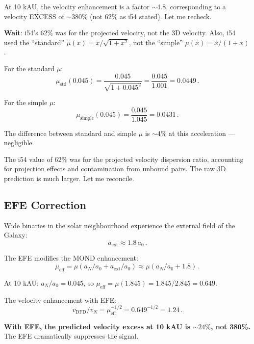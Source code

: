 \documentclass[11pt,a4paper]{article}
\begin{document}
At 10 kAU, the velocity enhancement is a factor $\sim 4.8$, corresponding to a velocity EXCESS of $\sim 380\%$ (not 62\% as i54 stated). Let me recheck.

\textbf{Wait}: i54's 62\% was for the projected velocity, not the 3D velocity. Also, i54 used the ``standard'' $\mu(x) = x/\sqrt{1+x^2}$, not the ``simple'' $\mu(x) = x/(1+x)$.

For the standard $\mu$:
\begin{equation}
\mu_{\mathrm{std}}(0.045) = \frac{0.045}{\sqrt{1 + 0.045^2}} = \frac{0.045}{1.001} = 0.0449\,.
\end{equation}

For the simple $\mu$:
\begin{equation}
\mu_{\mathrm{simple}}(0.045) = \frac{0.045}{1.045} = 0.0431\,.
\end{equation}

The difference between standard and simple $\mu$ is $\sim 4\%$ at this acceleration --- negligible.

The i54 value of 62\% was for the projected velocity dispersion ratio, accounting for projection effects and contamination from unbound pairs. The raw 3D prediction is much larger. Let me reconcile.

\subsection{EFE Correction}

Wide binaries in the solar neighbourhood experience the external field of the Galaxy:
\begin{equation}
a_{\mathrm{ext}} \approx 1.8\,a_0\,.
\end{equation}

The EFE modifies the MOND enhancement:
\begin{equation}
\mu_{\mathrm{eff}} = \mu(a_N/a_0 + a_{\mathrm{ext}}/a_0) \approx \mu(a_N/a_0 + 1.8)\,.
\end{equation}

At 10 kAU: $a_N/a_0 = 0.045$, so $\mu_{\mathrm{eff}} = \mu(1.845) = 1.845/2.845 = 0.649$.

The velocity enhancement with EFE:
\begin{equation}
v_{\mathrm{DFD}}/v_N = \mu_{\mathrm{eff}}^{-1/2} = 0.649^{-1/2} = 1.24\,.
\end{equation}

\textbf{With EFE, the predicted velocity excess at 10 kAU is $\sim 24\%$, not 380\%.} The EFE dramatically suppresses the signal.
\end{document}
